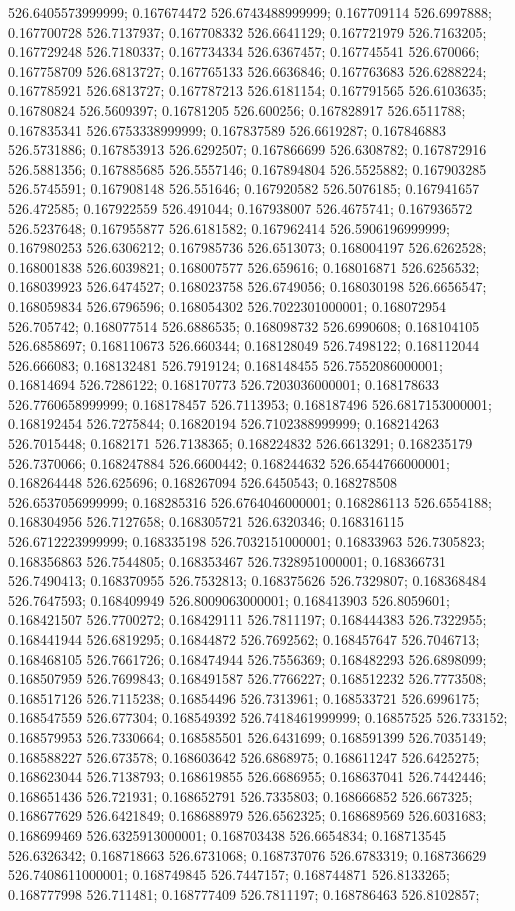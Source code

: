 526.6405573999999; 0.167674472 526.6743488999999; 0.167709114 526.6997888; 0.167700728 526.7137937; 0.167708332 526.6641129; 0.167721979 526.7163205; 0.167729248 526.7180337; 0.167734334 526.6367457; 0.167745541 526.670066; 0.167758709 526.6813727; 0.167765133 526.6636846; 0.167763683 526.6288224; 0.167785921 526.6813727; 0.167787213 526.6181154; 0.167791565 526.6103635; 0.16780824 526.5609397; 0.16781205 526.600256; 0.167828917 526.6511788; 0.167835341 526.6753338999999; 0.167837589 526.6619287; 0.167846883 526.5731886; 0.167853913 526.6292507; 0.167866699 526.6308782; 0.167872916 526.5881356; 0.167885685 526.5557146; 0.167894804 526.5525882; 0.167903285 526.5745591; 0.167908148 526.551646; 0.167920582 526.5076185; 0.167941657 526.472585; 0.167922559 526.491044; 0.167938007 526.4675741; 0.167936572 526.5237648; 0.167955877 526.6181582; 0.167962414 526.5906196999999; 0.167980253 526.6306212; 0.167985736 526.6513073; 0.168004197 526.6262528; 0.168001838 526.6039821; 0.168007577 526.659616; 0.168016871 526.6256532; 0.168039923 526.6474527; 0.168023758 526.6749056; 0.168030198 526.6656547; 0.168059834 526.6796596; 0.168054302 526.7022301000001; 0.168072954 526.705742; 0.168077514 526.6886535; 0.168098732 526.6990608; 0.168104105 526.6858697; 0.168110673 526.660344; 0.168128049 526.7498122; 0.168112044 526.666083; 0.168132481 526.7919124; 0.168148455 526.7552086000001; 0.16814694 526.7286122; 0.168170773 526.7203036000001; 0.168178633 526.7760658999999; 0.168178457 526.7113953; 0.168187496 526.6817153000001; 0.168192454 526.7275844; 0.16820194 526.7102388999999; 0.168214263 526.7015448; 0.1682171 526.7138365; 0.168224832 526.6613291; 0.168235179 526.7370066; 0.168247884 526.6600442; 0.168244632 526.6544766000001; 0.168264448 526.625696; 0.168267094 526.6450543; 0.168278508 526.6537056999999; 0.168285316 526.6764046000001; 0.168286113 526.6554188; 0.168304956 526.7127658; 0.168305721 526.6320346; 0.168316115 526.6712223999999; 0.168335198 526.7032151000001; 0.16833963 526.7305823; 0.168356863 526.7544805; 0.168353467 526.7328951000001; 0.168366731 526.7490413; 0.168370955 526.7532813; 0.168375626 526.7329807; 0.168368484 526.7647593; 0.168409949 526.8009063000001; 0.168413903 526.8059601; 0.168421507 526.7700272; 0.168429111 526.7811197; 0.168444383 526.7322955; 0.168441944 526.6819295; 0.16844872 526.7692562; 0.168457647 526.7046713; 0.168468105 526.7661726; 0.168474944 526.7556369; 0.168482293 526.6898099; 0.168507959 526.7699843; 0.168491587 526.7766227; 0.168512232 526.7773508; 0.168517126 526.7115238; 0.16854496 526.7313961; 0.168533721 526.6996175; 0.168547559 526.677304; 0.168549392 526.7418461999999; 0.16857525 526.733152; 0.168579953 526.7330664; 0.168585501 526.6431699; 0.168591399 526.7035149; 0.168588227 526.673578; 0.168603642 526.6868975; 0.168611247 526.6425275; 0.168623044 526.7138793; 0.168619855 526.6686955; 0.168637041 526.7442446; 0.168651436 526.721931; 0.168652791 526.7335803; 0.168666852 526.667325; 0.168677629 526.6421849; 0.168688979 526.6562325; 0.168689569 526.6031683; 0.168699469 526.6325913000001; 0.168703438 526.6654834; 0.168713545 526.6326342; 0.168718663 526.6731068; 0.168737076 526.6783319; 0.168736629 526.7408611000001; 0.168749845 526.7447157; 0.168744871 526.8133265; 0.168777998 526.711481; 0.168777409 526.7811197; 0.168786463 526.8102857; 